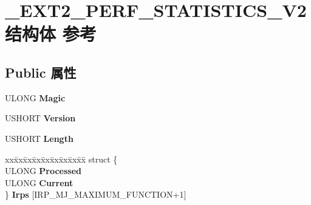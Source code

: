 \hypertarget{struct___e_x_t2___p_e_r_f___s_t_a_t_i_s_t_i_c_s___v2}{}\section{\+\_\+\+E\+X\+T2\+\_\+\+P\+E\+R\+F\+\_\+\+S\+T\+A\+T\+I\+S\+T\+I\+C\+S\+\_\+\+V2结构体 参考}
\label{struct___e_x_t2___p_e_r_f___s_t_a_t_i_s_t_i_c_s___v2}
\subsection*{Public 属性}
\begin{DoxyCompactItemize}
\item 
\mbox{\label{struct___e_x_t2___p_e_r_f___s_t_a_t_i_s_t_i_c_s___v2_aa20b03cf9493298ba30f2eded3285350}} 
U\+L\+O\+NG {\bfseries Magic}
\item 
\mbox{\label{struct___e_x_t2___p_e_r_f___s_t_a_t_i_s_t_i_c_s___v2_a56138f96a88c84dd10d1d963f2b0464a}} 
U\+S\+H\+O\+RT {\bfseries Version}
\item 
\mbox{\label{struct___e_x_t2___p_e_r_f___s_t_a_t_i_s_t_i_c_s___v2_a0cb756801fccffceb84674a1664104c0}} 
U\+S\+H\+O\+RT {\bfseries Length}
\item 
\mbox{\label{struct___e_x_t2___p_e_r_f___s_t_a_t_i_s_t_i_c_s___v2_a2e2d7910ccfecb0fe490924906959665}} 
\begin{tabbing}
xx\=xx\=xx\=xx\=xx\=xx\=xx\=xx\=xx\=\kill
struct \{\\
\>ULONG {\bfseries Processed}\\
\>ULONG {\bfseries Current}\\
\} {\bfseries Irps} \mbox{[}IRP\_MJ\_MAXIMUM\_FUNCTION+1\mbox{]}\\


\end{tabbing}
\end{DoxyCompactItemize}

